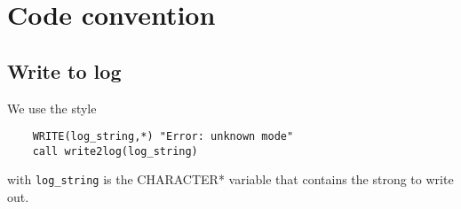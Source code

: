 \chapter{Code convention}
\label{chap:code_convention}

\section{Write to log}
\label{sec:write2log}

We use the style
\begin{Verbatim}
    WRITE(log_string,*) "Error: unknown mode"
    call write2log(log_string)
\end{Verbatim}
with \verb!log_string! is the CHARACTER* variable that contains the strong to
write out. 
